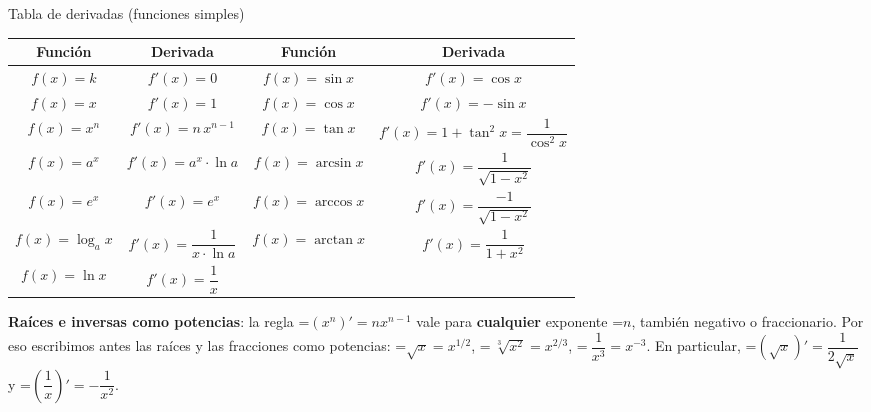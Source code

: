 \documentclass[11pt,a4paper]{article}
\newcommand{\fmm}[1]{\setbox0=\hbox{$#1$}\ifdim\wd0>\linewidth\[#1\]\else\mbox{\box0}\fi}
\newcommand{\fmuline}[1]{\textbf{\color{fmaccent}#1}}
\begin{document}
  
\begin{fmdef}{Tabla de derivadas (funciones simples)}
\begin{center}\renewcommand{\arraystretch}{1.5}\begin{tabular}{cccc}\toprule
\textbf{Función} & \textbf{Derivada} & \textbf{Función} & \textbf{Derivada}\\\midrule
$f(x)=k$ & $f'(x)=0$ & $f(x)=\sin x$ & $f'(x)=\cos x$\\
$f(x)=x$ & $f'(x)=1$ & $f(x)=\cos x$ & $f'(x)=-\sin x$\\
$f(x)=x^n$ & $f'(x)=n\,x^{n-1}$ & $f(x)=\tan x$ & $f'(x)=1+\tan^2x=\dfrac{1}{\cos^2x}$\\
$f(x)=a^x$ & $f'(x)=a^x\cdot\ln a$ & $f(x)=\arcsin x$ & $f'(x)=\dfrac{1}{\sqrt{1-x^2}}$\\
$f(x)=e^x$ & $f'(x)=e^x$ & $f(x)=\arccos x$ & $f'(x)=\dfrac{-1}{\sqrt{1-x^2}}$\\
$f(x)=\log_a x$ & $f'(x)=\dfrac{1}{x\cdot\ln a}$ & $f(x)=\arctan x$ & $f'(x)=\dfrac{1}{1+x^2}$\\[2ex]
$f(x)=\ln x$ & $f'(x)=\dfrac1x$ &  & \\[2ex]
\bottomrule\end{tabular}\end{center}

      
\begin{fmnote}\fmuline{Raíces e inversas como potencias}: la regla \fmm{(x^n)'=nx^{n-1}} vale para \textbf{cualquier} exponente \fmm{n}, también negativo o fraccionario. Por eso escribimos antes las raíces y las fracciones como potencias:
        \fmm{\sqrt x=x^{1/2}}, \fmm{\ \sqrt[3]{x^2}=x^{2/3}}, \fmm{\ \dfrac{1}{x^3}=x^{-3}}. En particular, \fmm{\left(\sqrt x\right)'=\dfrac{1}{2\sqrt x}} y \fmm{\left(\dfrac1x\right)'=-\dfrac{1}{x^2}}.\end{fmnote}
\end{fmdef}
\end{document}
